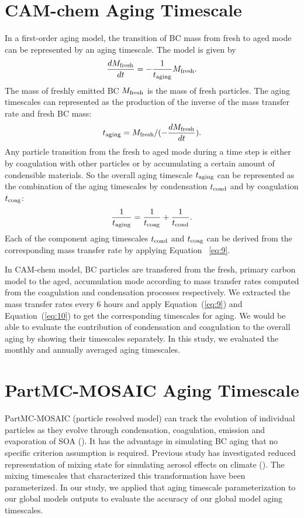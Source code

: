 \documentclass[12pt, fullpage]{uiucthesis2009}
\begin{document}
	
	\section{CAM-chem Aging Timescale}
	In a first-order aging model, the transition of BC mass from fresh to aged mode can be represented by an aging timescale. The model is given by
	\begin{align}
	\frac{dM_{\rm{fresh}}}{dt} = -\frac{1}{t_{\rm{aging}}}M_{\rm{fresh}}. 
	\end{align}
	The mass of freshly emitted BC $M_{\rm{fresh}}$ is the mass of fresh particles.
	The aging timescales can represented as the production of the inverse of the mass transfer rate and fresh BC mass: 
	\begin{align}\label{eq:9}
	t_{\rm{aging}} = M_{\rm{fresh}}/(-\frac{dM_{\rm{fresh}}}{dt}).
	\end{align}
	Any particle transition from the fresh to aged mode during a time step is either by coagulation with other particles or by accumulating a certain amount of condensible materials. So the overall aging timescale $t_{\rm{aging}}$ can be represented as the combination of the aging timescales by condensation $t_{\rm{cond}}$ and by coagulation $t_{\rm{coag}}$:
	\begin{align}\label{eq:10}
	\frac{1}{t_{\rm{aging}}} =\frac{1}{t_{\rm{coag}}} + \frac{1}{t_{\rm{cond}}}.
	\end{align}
	Each of the component aging timescales $t_{\rm{cond}}$ and $t_{\rm{coag}}$ can be derived from the corresponding mass transfer rate by applying Equation~ \ref{eq:9}. 
	
	In CAM-chem model, BC particles are transfered from the fresh, primary carbon model to the aged, accumulation mode according to mass transfer rates computed from the coagulation and condensation processes respectively. We extracted the mass transfer rates every 6 hours and apply Equation~(\ref{eq:9}) and Equation~(\ref{eq:10}) to get the corresponding timescales for aging. We would be able to evaluate the contribution of condensation and coagulation to the overall aging by showing their  timescales separately. In this study, we evaluated the monthly and annually averaged aging timescales. 
	
	\section{PartMC-MOSAIC Aging Timescale}
	PartMC-MOSAIC (particle resolved model) can track the evolution of individual particles as they evolve through condensation, coagulation, emission and evaporation of SOA (\cite{Riemer2013}). It has the advantage in simulating BC aging that no specific criterion assumption is required. Previous study has investigated reduced representation of mixing state for simulating aerosol effects on climate (\cite{Fierce2016}). The mixing timescales that characterized this transformation have been parameterized. In our study, we applied that aging timescale parameterization to our global models outputs to evaluate the accuracy of our global model aging timescales.
	
\end{document}
